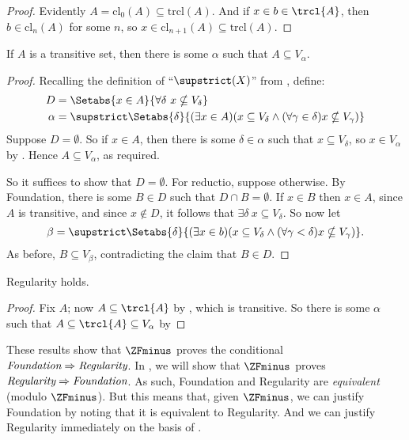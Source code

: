 \documentclass[../../../include/open-logic-section]{subfiles}
\begin{document}
\begin{proof}
Evidently $A = \text{cl}_0(A) \subseteq \text{trcl}(A)$. And if $x
\in b \in \trcl{A}$,  then $b \in \text{cl}_n(A)$ for some $n$, so $x
\in \text{cl}_{n+1}(A) \subseteq \text{trcl}(A)$. 
\end{proof}

\begin{lem}
If $A$ is a transitive set, then there is some $\alpha$ such that $A
\subseteq V_\alpha$.
\end{lem}

\begin{proof}
Recalling the definition of ``$\supstrict(X)$'' from
, define:
\begin{align*}
	D  &= \Setabs{x \in A}{\forall \delta\ x \nsubseteq V_\delta}\\
	\alpha &= \supstrict\Setabs{\delta}{(\exists x \in A)
	(x \subseteq V_\delta \land (\forall \gamma \in \delta)x \nsubseteq V_\gamma)}
\end{align*}
Suppose $D = \emptyset$. So if $x \in A$, then there is some $\delta
\in \alpha$ such that $x \subseteq V_\delta$, so $x \in V_\alpha$ by
. Hence $A \subseteq
V_{\alpha}$, as required. 

So it suffices to show that $D = \emptyset$. For reductio, suppose
otherwise. By Foundation, there is some $B \in D$ such that $D \cap B
= \emptyset$. If $x \in B$ then $x \in A$, since $A$ is transitive,
and since $x \notin D$, it follows that $\exists \delta\ x \subseteq
V_\delta$. So now let
\[
	\beta = \supstrict\Setabs{\delta}{(\exists x \in b)(x \subseteq V_\delta \land (\forall \gamma < \delta)x \nsubseteq V_\gamma)}.
\]
As before, $B \subseteq V_\beta$, contradicting the claim that $B \in
D$.	
\end{proof}

\begin{thm}
Regularity holds.
\end{thm}

\begin{proof}
Fix $A$; now $A \subseteq \trcl{A}$ by , which is transitive. So there is some $\alpha$ such that $A \subseteq \trcl{A} \subseteq V_\alpha$ by 
\end{proof}

These results show that $\ZFminus$ proves the conditional
$\emph{Foundation}\Rightarrow\emph{Regularity}$. In
, we will show that
$\ZFminus$ proves $\emph{Regularity}\Rightarrow\emph{Foundation}$. As
such, Foundation and Regularity are \emph{equivalent} (modulo
$\ZFminus$). But this means that, given $\ZFminus$, we can justify
Foundation by noting that it is equivalent to Regularity. And we can
justify Regularity immediately on the basis of \stageshier{}. 
\end{document}
